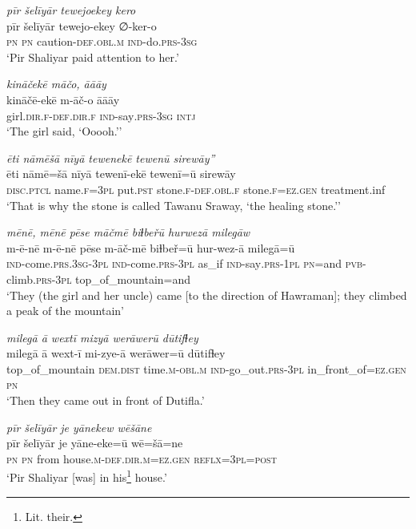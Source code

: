 \ea \label{ŽP.182}
\textit{pīr šelīyār tewejoekey kero} \\ 
\gll pīr šelīyār tewejo-ekey ∅-ker-o \\ 
 \textsc{pn} \textsc{pn} caution\textsc{-def}\textsc{.obl}\textsc{.m} \textsc{ind-}do\textsc{.prs}\textsc{-3sg} \\ 
\glt `Pir Shaliyar paid attention to her.'
\z 
 
\ea \label{ŽP.183}
\textit{kināčekē māčo, āāāy} \\ 
\gll kināčē-ekē m-āč-o āāāy \\ 
 girl\textsc{.dir}\textsc{.f}\textsc{-def}\textsc{.dir}\textsc{.f} \textsc{ind-}say\textsc{.prs}\textsc{-3sg} \textsc{intj} \\ 
\glt `The girl said, ‘Ooooh.’'
\z 
 
\ea \label{ŽP.185}
\textit{ēti nāmēšā nīyā tewenekē tewenū sirewāy”} \\ 
\gll ēti nāmē=šā nīyā tewenī-ekē tewenī=ū sirewāy \\ 
 \textsc{disc.ptcl} name\textsc{.f}\textsc{=3pl} put\textsc{.pst} stone\textsc{.f}\textsc{-def}\textsc{.obl}\textsc{.f} stone\textsc{.f}\textsc{\textsc{=ez.gen}} treatment.inf \\ 
\glt `That is why the stone is called Tawanu Sraway, ‘the healing stone.’'
\z 
 
\ea \label{ŽP.186}
\textit{mēnē, mēnē pēse māčmē biɫbeřū hurwezā milegāw} \\ 
\gll m-ē-nē m-ē-nē pēse m-āč-mē biɫbeř=ū hur-wez-ā milegā=ū \\ 
 \textsc{ind-}come\textsc{.prs}\textsc{.3sg}\textsc{-3pl} \textsc{ind-}come\textsc{.prs}\textsc{-3pl} as\_if \textsc{ind-}say\textsc{.prs}\textsc{-1pl} \textsc{pn}=and \textsc{pvb-}climb\textsc{.prs}\textsc{-3pl} top\_of\_mountain=and \\ 
\glt `They (the girl and her uncle) came [to the direction of Hawraman]; they climbed a peak of the mountain'
\z 
 
\ea \label{ŽP.187}
\textit{milegā ā wextī mizyā werāwerū dūtifɫey} \\ 
\gll milegā ā wext-ī mi-zye-ā werāwer=ū dūtifɫey \\ 
 top\_of\_mountain \textsc{dem.dist} time\textsc{.m}\textsc{-obl}\textsc{.m} \textsc{ind-}go\_out\textsc{.prs}\textsc{-3pl} in\_front\_of\textsc{\textsc{=ez.gen}} \textsc{pn} \\ 
\glt `Then they came out in front of  Dutifla.'
\z 
 
\ea \label{ŽP.188}
\textit{pīr šelīyār je yānekew wēšāne} \\ 
\gll pīr šelīyār je yāne-eke=ū wē=šā=ne \\ 
 \textsc{pn} \textsc{pn} from house\textsc{.m}\textsc{-def}\textsc{.dir}\textsc{.m}\textsc{\textsc{=ez.gen}} \textsc{reflx}\textsc{=3pl}\textsc{=\textsc{post}} \\ 
\glt `Pir Shaliyar [was] in his\footnote{Lit. their.} house.'
\z 
 
